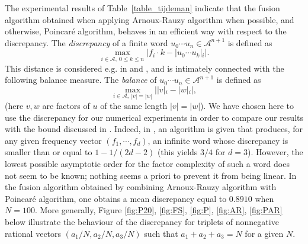 \documentclass[preliminary,copyright,creativecommons]{eptcs}
\begin{document}
The experimental results  of Table~\ref{table_tijdeman} indicate that the     fusion algorithm obtained when applying Arnoux-Rauzy algorithm when possible, and  otherwise,       Poincar\'e algorithm, behaves in an efficient way  with respect to   the discrepancy. The  {\em discrepancy }    of  a  finite word  $u_0\cdots u_n \in {\mathcal A}^{n+1}$ is defined  as 
 $$\max_{i \in {\mathcal A}, \ 0 \leq k \leq n}    | f_i  \cdot k - | u_0\cdots u_k| _i |.$$  This distance is considered e.g.  in \cite{tij} and \cite{Adam},
 and is intimately connected with the following   balance measure.  The  {\em balance} of $u_0\cdots u_n \in {\mathcal A}^{n+1}$ is defined as 
$$\max_{i \in {\mathcal A}, \  |v|=|w|}  ||v|_i - |w|_i| ,$$ 
(here $v,w$ are     factors   of $u$ of the same length $|v|=|w|$).  We have chosen here to use the discrepancy for our  numerical experiments in order
to compare our results with the  bound  discussed  in  \cite{tij}.
Indeed, in   \cite{tij},   an  algorithm   is given that produces, for any given  frequency vector $(f_1, \cdots, f_d)$,   an infinite word   whose
 discrepancy   is smaller than or equal to $1-1/(2d-2)$ (this yields $3/4$ for $d=3$). However,   the  lowest possible   asymptotic order  for the  factor complexity of   such a  word     does not seem to be   known; nothing seems  a priori to prevent it  from  being linear.  In the fusion algorithm obtained  by combining Arnoux-Rauzy algorithm with Poincar\'e algorithm,
 one obtains   a mean  discrepancy   equal to $0.8910$ when $N=100$. More generally, Figure  \ref{fig:P20}, \ref{fig:FS},  \ref{fig:P}, \ref{fig:AR}, \ref{fig:PAR} below  illustrate  the behaviour  of the discrepancy 
for   triplets of nonnegative rational  vectors   $(a_1/N,a_2/N,a_3/N)$ such that $a_1+a_2+a_3=N$  for a  given $N$.
\end{document}
